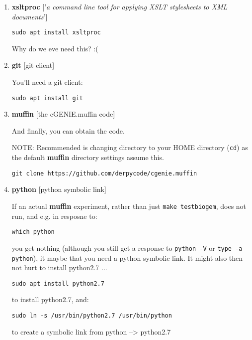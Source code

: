 \documentclass[11pt,fleqn]{book} %
\begin{document}
\begin{enumerate}[noitemsep]
['creates the necessary links and cache to the most recent shared libraries found in ... the file \texttt{/etc/ld.so.conf}, and in the trusted directories, \texttt{/lib} and \texttt{/usr/lib}']

\vspace{8pt}

\item \textbf{xsltproc} ['\textit{a command line tool for applying XSLT stylesheets to XML documents}']

\begin{verbatim}
sudo apt install xsltproc
\end{verbatim}

Why do we eve need this? :(

\vspace{4pt}
\item \textbf{git} [git client]

You'll need a git client:

\begin{verbatim}
sudo apt install git
\end{verbatim}

\item \textbf{muffin} [the cGENIE.muffin code]

And finally, you can obtain the code.

NOTE: Recommended is changing directory to your HOME directory (\texttt{cd}) as the default \textbf{muffin} directory settings assume this. 

\begin{verbatim}
git clone https://github.com/derpycode/cgenie.muffin
\end{verbatim}

\vspace{4pt}
\item \textbf{python} [python symbolic link]

If an actual \textbf{muffin} experiment, rather than just \texttt{make testbiogem}, does not run, and e.g. in resposne to:

\begin{verbatim}
which python
\end{verbatim}

you get nothing (although you still get a response to \texttt{python -V} or \texttt{type -a python}), it maybe that you need a python symbolic link. It might also then not hurt to install python2.7 ...

\begin{verbatim}
sudo apt install python2.7
\end{verbatim}

to install python2.7, and:

\begin{verbatim}
sudo ln -s /usr/bin/python2.7 /usr/bin/python
\end{verbatim}

to create a symbolic link from python --> python2.7

\end{enumerate}
\end{document}
